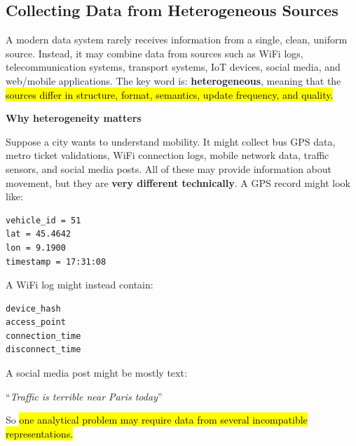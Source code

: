 \subsection{Collecting Data from Heterogeneous Sources}\label{subsec:big-data--collecting-data-from-heterogeneous-sources}

A modern data system rarely receives information from a single, clean, uniform source. Instead, it may combine data from sources such as WiFi logs, telecommunication systems, transport systems, IoT devices, social media, and web/mobile applications. The key word is: \textbf{heterogeneous}, meaning that the \hl{sources differ in structure, format, semantics, update frequency, and quality.}

\highspace
\begin{flushleft}
    \textcolor{Green3}{ \textbf{Why heterogeneity matters}}
\end{flushleft}
Suppose a city wants to understand mobility. It might collect bus GPS data, metro ticket validations, WiFi connection logs, mobile network data, traffic sensors, and social media posts. All of these may provide information about movement, but they are \textbf{very different technically}. A GPS record might look like:
\begin{lstlisting}
vehicle_id = 51
lat = 45.4642
lon = 9.1900
timestamp = 17:31:08
\end{lstlisting}
A WiFi log might instead contain:
\begin{lstlisting}
device_hash
access_point
connection_time
disconnect_time
\end{lstlisting}
A social media post might be mostly text:
\begin{center}
    ``\emph{Traffic is terrible near Paris today}''
\end{center}
So \hl{one analytical problem may require data from several incompatible representations.}

